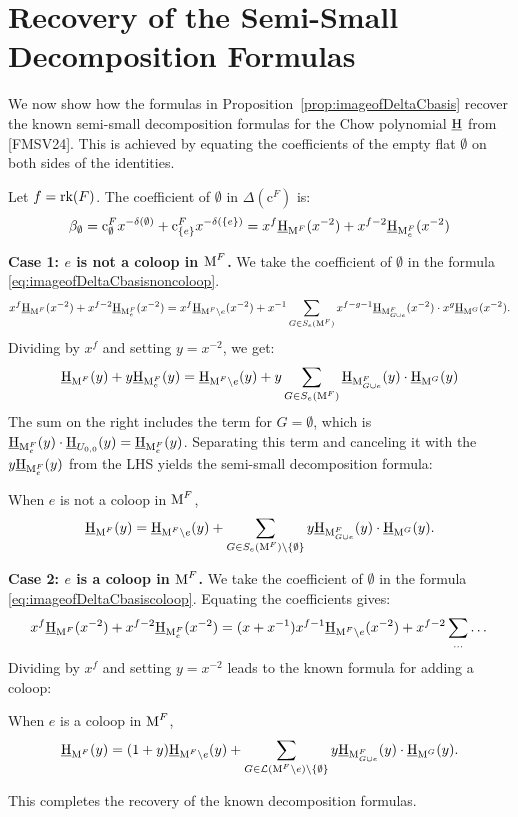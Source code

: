 \documentclass[11pt]{article}
\newcommand{\chow}{\normalfont\text{\underline{H}}}
\newcommand{\rank}{\normalfont\text{rk}}
\newcommand{\M}{\normalfont\text{M}}
\newcommand{\Ebasis}[1]{\mathrm{#1}}
\newcommand{\Cbasis}[1]{\mathrm{c}^{#1}}
\newcommand{\CbasisSub}[2]{\mathrm{c}^{#1}_{#2}}
\theoremstyle{remark}
\begin{document}
\section{Recovery of the Semi-Small Decomposition Formulas}

We now show how the formulas in Proposition~\ref{prop:imageofDeltaCbasis} recover the known
semi-small decomposition formulas for the Chow polynomial \(\chow\) from [FMSV24]. This
is achieved by equating the coefficients of the empty flat \(\Ebasis{\emptyset}\) on both sides of the identities.

Let \(f = \rank(F)\). The coefficient of \(\Ebasis{\emptyset}\) in \(\Delta(\Cbasis{F})\) is:
\[ \beta_\emptyset = \CbasisSub{F}{\emptyset}x^{-\delta(\emptyset)} + \CbasisSub{F}{\{e\}}x^{-\delta(\{e\})} = x^f \chow_{\M^F}(x^{-2}) + x^{f-2}\chow_{\M^F_e}(x^{-2}) \]

\textbf{Case 1: \(e\) is not a coloop in \(\M^F\).}
We take the coefficient of \(\Ebasis{\emptyset}\) in the formula \eqref{eq:imageofDeltaCbasisnoncoloop}.
\[ x^{f}\chow_{\M^F}(x^{-2}) + x^{f-2}\chow_{\M^F_e}(x^{-2}) = x^{f}\chow_{\M^F\setminus e}(x^{-2}) +
    x^{-1}\sum_{G \in S_e(\M^F)}x^{f-g-1}\chow_{\M^F_{G\cup e}}(x^{-2})\cdot x^g\chow_{\M^G}(x^{-2}). \]
Dividing by \(x^f\) and setting \(y=x^{-2}\), we get:
\[ \chow_{\M^F}(y) + y\chow_{\M^F_e}(y) = \chow_{\M^F\setminus e}(y) + y\sum_{G \in S_e(\M^F)}\chow_{\M^F_{G\cup e}}(y)\cdot \chow_{\M^G}(y)\]
The sum on the right includes the term for \(G=\emptyset\), which is \(\chow_{\M^F_e}(y) \cdot \chow_{U_{0,0}}(y) = \chow_{\M^F_e}(y)\). Separating this term and canceling it with the \(y\chow_{\M^F_e}(y)\) from the LHS yields the semi-small decomposition formula:
\begin{tcolorbox}
    When \(e\) is not a coloop in \(\M^F\),
    \begin{equation} \label{eq:semi-small-decomposition-noncoloop}
        \chow_{\M^F}(y) = \chow_{\M^F\setminus e}(y) + \sum_{G \in S_e(\M^F)\setminus\{\emptyset\}} y \chow_{\M^F_{G\cup e}}(y) \cdot \chow_{\M^G}(y).
    \end{equation}
\end{tcolorbox}

\textbf{Case 2: \(e\) is a coloop in \(\M^F\).}
We take the coefficient of \(\Ebasis{\emptyset}\) in the formula \eqref{eq:imageofDeltaCbasiscoloop}.
Equating the coefficients gives:
\[ x^f \chow_{\M^F}(x^{-2}) + x^{f-2}\chow_{\M^F_e}(x^{-2}) = (x+x^{-1})x^{f-1}\chow_{\M^F\setminus e}(x^{-2}) + x^{f-2}\sum_{\dots} \dots \]
Dividing by \(x^f\) and setting \(y=x^{-2}\) leads to the known formula for adding a coloop:
\begin{tcolorbox}
    When \(e\) is a coloop in \(\M^F\),
    \begin{equation} \label{eq:semi-small-decomposition-coloop}
        \chow_{\M^F}(y) = (1+y)\chow_{\M^F\setminus e}(y) +
        \sum_{G \in \mathcal{L}(\M^F\setminus e)\setminus\{\emptyset\}}y \chow_{\M^F_{G\cup e}}(y) \cdot
        \chow_{\M^G}(y).
    \end{equation}
\end{tcolorbox}
This completes the recovery of the known decomposition formulas.
\end{document}
